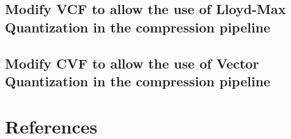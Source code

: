 \subsection{Modify VCF to allow the use of Lloyd-Max Quantization in the compression pipeline}
\subsection{Modify CVF to allow the use of Vector Quantization in the compression pipeline}

\section{References}

\renewcommand{\addcontentsline}[3]{}%

